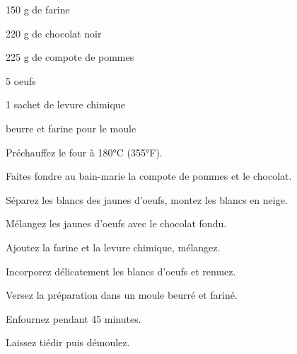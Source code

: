 


\totaltime{}


\begin{ingredients}
    \item 150 g de farine
    \item 220 g de chocolat noir
    \item 225 g de compote de pommes
    \item 5 oeufs
    \item 1 sachet de levure chimique
    \item beurre et farine pour le moule
\end{ingredients}

\begin{steps}
    \item Préchauffez le four à 180°C (355°F).
    \item Faites fondre au bain-marie la compote de pommes et le chocolat.
    \item Séparez les blancs des jaunes d'oeufs, montez les blancs en neige.
    \item Mélangez les jaunes d'oeufs avec le chocolat fondu.
    \item Ajoutez la farine et la levure chimique, mélangez.
    \item Incorporez délicatement les blancs d'oeufs et remuez.
    \item Versez la préparation dans un moule beurré et fariné.
    \item Enfournez pendant 45 minutes.
    \item Laissez tiédir puis démoulez.
\end{steps}
